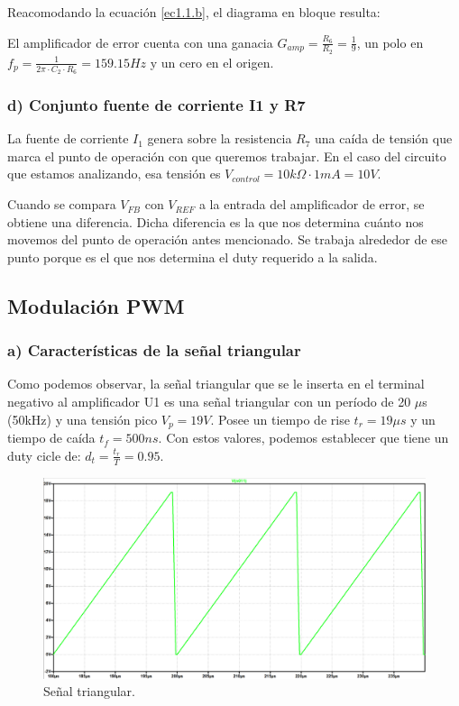 \documentclass[e4_tp2_main.tex]{subfiles}
\begin{document}
Reacomodando la ecuaci\'on \eqref{ec1.1.b}, el diagrama en bloque resulta: 

\begin{center}
\end{center}


El amplificador de error cuenta con una ganacia $G_{amp}=\frac{R_6}{R_2} =\frac{1}{9}$, un polo en $f_p=\frac{1}{2 \pi \cdot C_2 \cdot R_6 }=159.15Hz$ y un cero en el origen.


\subsubsection*{d) Conjunto fuente de corriente I1 y R7}
La fuente de corriente $I_1$ genera sobre la resistencia $R_7$ una ca\'ida de tensi\'on que marca el punto de operaci\'on con que queremos trabajar. En el caso del circuito que estamos analizando, esa tensi\'on es $V_{control}=10k\Omega \cdot 1mA =10V$. 

Cuando se compara $V_{FB}$ con $V_{REF}$ a la entrada del amplificador de error, se obtiene una diferencia. Dicha diferencia es la que nos determina cu\'anto nos movemos del punto de operaci\'on antes mencionado. Se trabaja alrededor de ese punto porque es el que nos determina el duty requerido a la salida.

\subsection{Modulaci\'on PWM}


\subsubsection*{a) Caracter\'isticas de la se\~nal triangular}
Como podemos observar, la señal triangular que se le inserta en el terminal negativo al amplificador U1 es una señal triangular con un período de 20 $\mu $s (50kHz) y una tensión pico $V_p=19 V$. Posee un tiempo de rise $t_r=19 \mu s$ y un tiempo de caída $t_f=500ns$. Con estos valores, podemos establecer que tiene un duty cicle de: $d_t= \frac{t_r}{T}=0.95$. 
\begin{figure}[H]
\centering
\includegraphics[width=0.4\linewidth]{Imagenes/Punto1/triang_shape.png}
\caption{Señal triangular.}
\end{figure}
\end{document}
